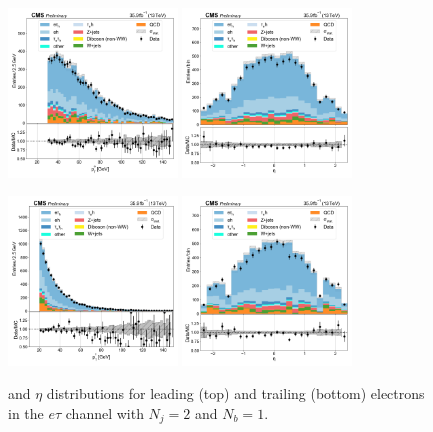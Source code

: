 \begin{figure}[htb!]
    \centering
    \includegraphics[width=0.4\textwidth]{chapters/Appendix/sectionPlots/figures/data_mc_overlays/etau_2016_cat_eq2_eq1_signal_linear_lepton_lepton1_pt}
    \includegraphics[width=0.4\textwidth]{chapters/Appendix/sectionPlots/figures/data_mc_overlays/etau_2016_cat_eq2_eq1_signal_linear_lepton_lepton1_eta}

    \includegraphics[width=0.4\textwidth]{chapters/Appendix/sectionPlots/figures/data_mc_overlays/etau_2016_cat_eq2_eq1_signal_linear_lepton_lepton2_pt}
    \includegraphics[width=0.4\textwidth]{chapters/Appendix/sectionPlots/figures/data_mc_overlays/etau_2016_cat_eq2_eq1_signal_linear_lepton_lepton2_eta}
    \caption{\pt and $\eta$ distributions for leading (top) and trailing
        (bottom) electrons in the $e\tau$ channel with $N_{j} = 2$ and
        $N_{b} = 1$.}
    \label{fig:etau_5_kinematic}
\end{figure}

